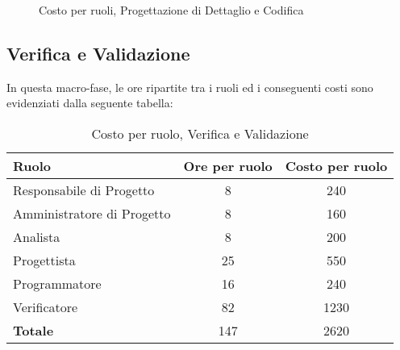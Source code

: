 \begin{figure}[h]
\centering
{}
\caption{Costo per ruoli, Progettazione di Dettaglio e Codifica}
\end{figure}

\newpage
\subsection{Verifica e Validazione}
In questa macro-fase, le ore ripartite tra i ruoli ed i conseguenti costi sono evidenziati dalla seguente tabella:

\begin{table}[h]
\centering
\begin{tabular}{|l|c|c|}
	\toprule
	\textbf{Ruolo} & \textbf{Ore per ruolo} & \textbf{Costo per ruolo} \\
		
	\midrule
	Responsabile di Progetto & 8 & 240 \\
	Amministratore di Progetto & 8 & 160 \\ 
	Analista & 8 & 200 \\
	Progettista & 25 & 550 \\
	Programmatore & 16 & 240 \\
	Verificatore & 82 & 1230 \\
	\midrule
	\textbf{Totale} & 147 & 2620 \\
		
	\bottomrule
\end{tabular}
\caption{Costo per ruolo, Verifica e Validazione}
\end{table}

